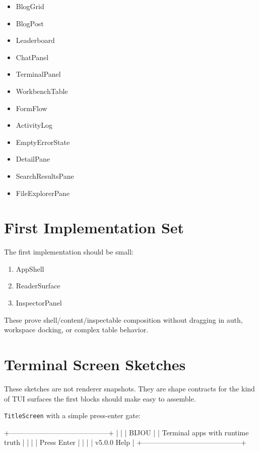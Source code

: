 \begin{itemize}
\item
  BlogGrid
\item
  BlogPost
\item
  Leaderboard
\item
  ChatPanel
\item
  TerminalPanel
\item
  WorkbenchTable
\item
  FormFlow
\item
  ActivityLog
\item
  EmptyErrorState
\item
  DetailPane
\item
  SearchResultsPane
\item
  FileExplorerPane
\end{itemize}

\section{First Implementation Set}\label{record-128-first-implementation-set}

The first implementation should be small:

\begin{enumerate}
\def\labelenumi{\arabic{enumi}.}
\tightlist
\item
  AppShell
\item
  ReaderSurface
\item
  InspectorPanel
\end{enumerate}

These prove shell/content/inspectable composition without dragging in auth, workspace docking, or complex table behavior.

\section{Terminal Screen Sketches}\label{record-128-terminal-screen-sketches}

These sketches are not renderer snapshots. They are shape contracts for the kind of TUI surfaces the first blocks should make easy to assemble.

\texttt{T\allowbreak{}i\allowbreak{}t\allowbreak{}l\allowbreak{}e\allowbreak{}S\allowbreak{}c\allowbreak{}r\allowbreak{}e\allowbreak{}e\allowbreak{}n} with a simple press-enter gate:

\begin{CodeBlock}
+------------------------------------------+
|                                          |
|                 BIJOU                    |
|        Terminal apps with runtime truth   |
|                                          |
|              Press Enter                 |
|                                          |
|  v5.0.0                         Help     |
+------------------------------------------+
\end{CodeBlock}

